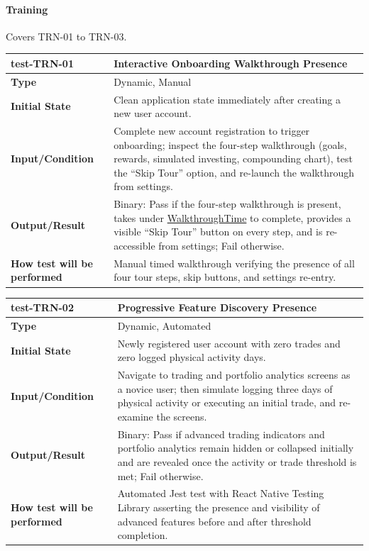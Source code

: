\documentclass[12pt, titlepage]{article}
\newcommand{\const}[1]{\hyperlink{const:#1}{\textsf{#1}}}
\begin{document}
\paragraph{Training}

Covers TRN-01 to TRN-03.

\noindent\begin{tabularx}{\textwidth}{>{\raggedright\arraybackslash}p{3.5cm}X}
  \toprule
  \textbf{test-TRN-01} & \textbf{Interactive Onboarding Walkthrough Presence}\\
  \midrule
  \textbf{Type} & Dynamic, Manual\\
  \textbf{Initial State} & Clean application state immediately after creating a new user account.\\
  \textbf{Input/Condition} & Complete new account registration to trigger onboarding; inspect the four-step walkthrough (goals, rewards, simulated investing, compounding chart), test the ``Skip Tour'' option, and re-launch the walkthrough from settings.\\
  \textbf{Output/Result} & Binary: Pass if the four-step walkthrough is present, takes under \const{WalkthroughTime} to complete, provides a visible ``Skip Tour'' button on every step, and is re-accessible from settings; Fail otherwise.\\
  \textbf{How test will be performed} & Manual timed walkthrough verifying the presence of all four tour steps, skip buttons, and settings re-entry.\\
  \bottomrule
\end{tabularx}

\vspace{1em}

\noindent\begin{tabularx}{\textwidth}{>{\raggedright\arraybackslash}p{3.5cm}X}
  \toprule
  \textbf{test-TRN-02} & \textbf{Progressive Feature Discovery Presence}\\
  \midrule
  \textbf{Type} & Dynamic, Automated\\
  \textbf{Initial State} & Newly registered user account with zero trades and zero logged physical activity days.\\
  \textbf{Input/Condition} & Navigate to trading and portfolio analytics screens as a novice user; then simulate logging three days of physical activity or executing an initial trade, and re-examine the screens.\\
  \textbf{Output/Result} & Binary: Pass if advanced trading indicators and portfolio analytics remain hidden or collapsed initially and are revealed once the activity or trade threshold is met; Fail otherwise.\\
  \textbf{How test will be performed} & Automated Jest test with React Native Testing Library asserting the presence and visibility of advanced features before and after threshold completion.\\
  \bottomrule
\end{tabularx}
\end{document}
